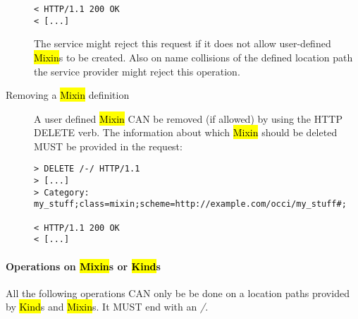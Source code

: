 \documentclass[10pt,a4paper]{article}
\begin{document}
\begin{description}
\begin{verbatim}
< HTTP/1.1 200 OK
< [...]
\end{verbatim}
The service might reject this request if it does not allow
user-defined \hl{Mixin}s to be created. Also on name collisions of the
defined location path the service provider might reject this
operation.

\item[Removing a \hl{Mixin} definition] A user defined
  \hl{Mixin} CAN be removed (if allowed) by using the HTTP DELETE
  verb. The information about which \hl{Mixin} should be deleted MUST
  be provided in the request:
\begin{verbatim}
> DELETE /-/ HTTP/1.1
> [...]
> Category: my_stuff;class=mixin;scheme=http://example.com/occi/my_stuff#;

< HTTP/1.1 200 OK
< [...]
\end{verbatim}
\end{description}

\paragraph{Operations on \hl{Mixin}s or \hl{Kind}s}
All the following operations CAN only be be done on a location paths
provided by \hl{Kind}s and \hl{Mixin}s. It MUST end with an
\emph{/}.
\end{document}
